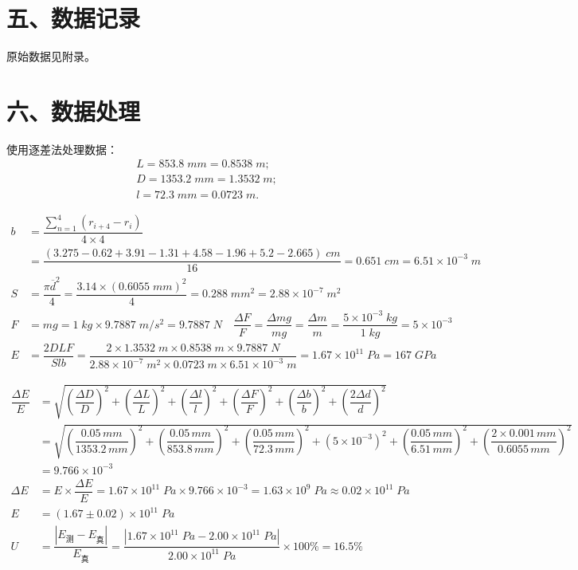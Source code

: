 \documentclass[11pt]{article}
\begin{document}
\section*{五、数据记录}

原始数据见附录。

\section*{六、数据处理}

使用逐差法处理数据：
\begin{align*}
    L=853.8\;mm=0.8538\;m; \\
    D=1353.2\;mm=1.3532\;m; \\
    l=72.3\;mm=0.0723\;m.
\end{align*}

\begin{align*}
    b&=\dfrac{\sum_{n=1}^{4}(r_{i+4}-r_i)}{4\times4} \\
    &=\dfrac{(3.275-0.62+3.91-1.31+4.58-1.96+5.2-2.665)\;cm}{16}=0.651\;cm=6.51\times10^{-3}\;m \\
    S&=\dfrac{\pi\overline{d}^2}{4}=\dfrac{3.14\times(0.6055\;mm)^2}{4}=0.288\;mm^2=2.88\times10^{-7}\;m^2\quad \\
    F&=mg=1\;kg\times9.7887\;m/s^2=9.7887\;N\quad\dfrac{\Delta F}{F}=\dfrac{\Delta mg}{mg}=\dfrac{\Delta m}{m}=\dfrac{5\times10^{-3}\;kg}{1\;kg}=5\times10^{-3} \\
    E&=\dfrac{2DLF}{Slb}=\dfrac{2\times1.3532\;m\times0.8538\;m\times9.7887\;N}{2.88\times10^{-7}\;m^2\times0.0723\;m\times6.51\times10^{-3}\;m}=1.67\times10^{11}\;Pa=167\;GPa
\end{align*}

\begin{align*}
    \dfrac{\Delta E}{E}&=\sqrt{\left(\dfrac{\Delta D}{D}\right)^2+\left(\dfrac{\Delta L}{L}\right)^2+\left(\dfrac{\Delta l}{l}\right)^2+\left(\dfrac{\Delta F}{F}\right)^2+\left(\dfrac{\Delta b}{b}\right)^2+\left(\dfrac{2\Delta d}{d}\right)^2} \\
    &=\sqrt{\left(\dfrac{0.05\,mm}{1353.2\,mm}\right)^2+\left(\dfrac{0.05\,mm}{853.8\,mm}\right)^2+\left(\dfrac{0.05\,mm}{72.3\,mm}\right)^2+\left(5\times10^{-3}\right)^2+\left(\dfrac{0.05\,mm}{6.51\,mm}\right)^2+\left(\dfrac{2\times0.001\,mm}{0.6055\,mm}\right)^2} \\
    &=9.766\times10^{-3} \\
    \Delta E&=E\times\dfrac{\Delta E}{E}=1.67\times10^{11}\;Pa\times9.766\times10^{-3}=1.63\times10^9\;Pa\approx0.02\times10^{11}\;Pa \\
    E&=(1.67\pm0.02)\times10^{11}\;Pa \\
    U&=\dfrac{|E_{\text{测}}-E_{\text{真}}|}{E_{\text{真}}}=\dfrac{|1.67\times10^{11}\;Pa-2.00\times10^{11}\;Pa|}{2.00\times10^{11}\;Pa}\times100\%=16.5\%
\end{align*}
\end{document}
